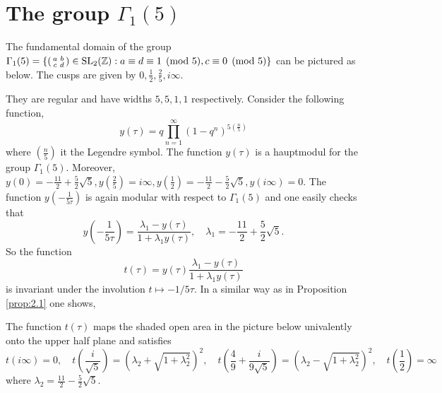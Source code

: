 \section{The group $\Gamma_1(5)$}

The fundamental domain of the group $\Gamma_1(5) = \{ (\begin{smallmatrix}
    a & b \\ c & d
\end{smallmatrix}) \in \mathrm{SL}_2(\mathbb{Z}): a \equiv d \equiv 1 \pmod{5}, c \equiv 0\pmod{5}\}$ can be pictured as below.
The cusps are given by $0, \frac{1}{2}, \frac{2}{5}, i\infty$.
\begin{center}
\end{center}
They are regular and have widths $5, 5, 1, 1$ respectively.
Consider the following function,
$$
y(\tau) = q \prod_{n = 1}^{\infty} (1 - q^n)^{5 \left(\frac{n}{5}\right)}
$$
where $\left(\frac{n}{5} \right)$ it the Legendre symbol.
The function $y(\tau)$ is a hauptmodul for the group $\Gamma_1(5)$.
Moreover, $y(0) = - \frac{11}{2} + \frac{5}{2} \sqrt{5}, y(\frac{2}{5}) = i\infty, y(\frac{1}{2}) = -\frac{11}{2} - \frac{5}{2} \sqrt{5}, y(i\infty) = 0$.
The function $y(-\frac{1}{5\tau})$ is again modular with respect to $\Gamma_1(5)$ and one easily checks that
$$
y\left(-\frac{1}{5 \tau}\right) = \frac{\lambda_1 - y(\tau)}{1 + \lambda_1 y(\tau)}, \quad \lambda_1 = -\frac{11}{2} + \frac{5}{2} \sqrt{5}.
$$
So the function
$$
    t(\tau) = y(\tau) \frac{\lambda_1 - y(\tau)}{1 + \lambda_1 y(\tau)}
$$
is invariant under the involution $t \mapsto -1 / 5\tau$.
In a similar way as in Proposition \ref{prop:2.1} one shows,

\begin{proposition}
\label{prop:3.1}
The function $t(\tau)$ maps the shaded open area in the picture below univalently onto the upper half plane and satisfies
$$
    t(i\infty) = 0, \quad t\left(\frac{i}{\sqrt{5}}\right) = (\lambda_2 + \sqrt{1 + \lambda_2^2})^2, \quad t \left(\frac{4}{9} + \frac{i}{9\sqrt{5}}\right) = (\lambda_2 - \sqrt{1 + \lambda_2^2})^2, \quad t\left(\frac{1}{2}\right) = \infty
$$
where $\lambda_2 = \frac{11}{2} - \frac{5}{2} \sqrt{5}$.
\end{proposition}

